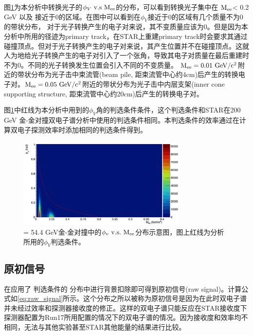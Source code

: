 图\ref{fig:PhiV_2D}为本分析中转换光子的$\phi_V~\rm{v.s~M_{ee}}$的分布，可以看到转换光子集中在 ${\rm M_{ee} }$< 0.2 GeV 以及 \PhiV 接近于0的区域。在图中可以看到在$\phi_V$接近于0的区域有几个质量不为0的带状分布，
对于光子转换产生的电子对来说，其不变质量应该为0。但是因为本分析中所用的径迹为primary track，在STAR上重建primary track时会要求其通过碰撞顶点。但对于光子转换产生的电子对来说，其产生位置并不在碰撞顶点。这就人为地给光子转换产生的电子对引入了一个张角，导致其电子对质量在最后重建时不为0。不同的光子转换发生位置会引入不同的不变质量。
$\rm{M_{ee}}=\rm{0.01~GeV/c^2}$附近的带状分布为光子击中束流管(beam pile, 距束流管中心约4cm)后产生的转换电子对。$\rm{M_{ee}}=\rm{0.05~GeV/c^2}$附近的带状分布为光子击中内层支架(inner cone supporting structure, 距束流管中心约20cm)后产生的转换电子对。

图\ref{fig:PhiV_2D}中红线为本分析中用到的$\phi_V$角的判选条件条件，这个判选条件和STAR在200 GeV 金-金对撞双电子谱分析中使用的判选条件相同\cite{STAR:2013pwb}。本判选条件的效率通过在计算双电子探测效率时添加相同的判选条件得到。

\begin{figure}[htb]
  \begin{center}
  \includegraphics[width=0.75\textwidth,clip]{figures/Chapter4/PhiV_2D.png}
  \end{center}
  \caption[\sNN = 54.4 GeV金-金对撞中的$\phi_v \rm{v.s M_{ee}}$分布示意图]{\sNN = 54.4 GeV金-金对撞中的$\phi_v \rm{~v.s.~M_{ee}}$分布示意图，图上红线为分析所用的$\phi_V$判选条件。}
  \label{fig:PhiV_2D}
\end{figure}

\subsection{原初信号}
\label{chap:raw_signal}
在应用了 \PhiV 判选条件的 \Npm 分布中进行背景扣除即可得到原初信号(raw signal)。计算公式如\ref{eq:raw_signal}所示。这个分布之所以被称为原初信号是因为在此时双电子谱并未经过效率和探测器接收度的修正。这样的双电子谱只能反应在STAR接收度下探测器配置为Run17所用配置的情况下的双电子谱的情况。因为接收度和效率均不相同，无法与其他实验甚至STAR其他能量的结果进行比较。

